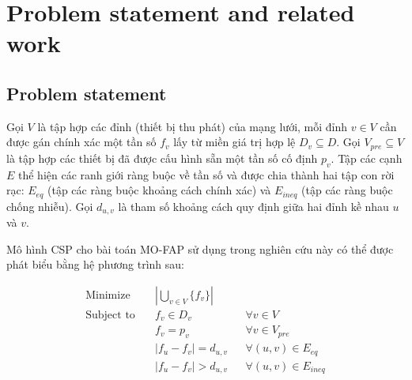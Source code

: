 \documentclass[letterpaper,journal]{IEEEtran}
\begin{document}
\section{Problem statement and related work}
\label{sec:Problem_statement}

\subsection{Problem statement}
Gọi $V$ là tập hợp các đỉnh (thiết bị thu phát) của mạng lưới, mỗi đỉnh $v \in V$ cần được gán chính xác một tần số $f_v$ lấy từ miền giá trị hợp lệ $D_v \subseteq D$. Gọi $V_{pre} \subseteq V$ là tập hợp các thiết bị đã được cấu hình sẵn một tần số cố định $p_v$. Tập các cạnh $E$ thể hiện các ranh giới ràng buộc về tần số và được chia thành hai tập con rời rạc: $E_{eq}$ (tập các ràng buộc khoảng cách chính xác) và $E_{ineq}$ (tập các ràng buộc chống nhiễu). Gọi $d_{u,v}$ là tham số khoảng cách quy định giữa hai đỉnh kề nhau $u$ và $v$. 

Mô hình CSP cho bài toán MO-FAP sử dụng trong nghiên cứu này có thể được phát biểu bằng hệ phương trình sau:

\begin{align}
    \text{Minimize} \quad & \left| \bigcup_{v \in V} \{f_v\} \right| \label{eq:csp_obj} \\
    \text{Subject to} \quad 
    & f_v \in D_v && \forall v \in V \label{eq:csp_domain} \\
    & f_v = p_v && \forall v \in V_{pre} \label{eq:csp_preassign} \\
    & |f_u - f_v| = d_{u,v} && \forall (u, v) \in E_{eq} \label{eq:csp_exact} \\
    & |f_u - f_v| > d_{u,v} && \forall (u, v) \in E_{ineq} \label{eq:csp_ineq}
\end{align}
\end{document}
